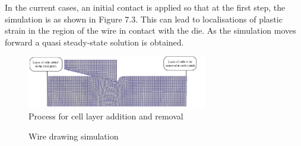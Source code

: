 \documentclass[sn-mathphys,Numbered,draft]{sn-jnl}%
\begin{document}
In the current cases, an initial contact is applied so that at the first step, the simulation is as shown in Figure 7.3. This can lead to localisations of plastic strain in the region of the wire in contact with the die. As the simulation moves forward a quasi steady-state solution is obtained. 


\begin{figure}[htb]
\begin{center}
	\includegraphics[width=0.7\textwidth]{./Figures/SimulationAndAnalysis/wireMesh_InletOutlet.jpg}
\caption{Process for cell layer addition and removal}
\label{fig:wireInletOutlet}
\end{center}
\end{figure}



\begin{figure}[t!]
	\centering
	  \qquad
        \qquad
		
		\caption{Wire drawing simulation}
	\label{label_for_entire_figure}
\end{figure}
\FloatBarrier
\end{document}
